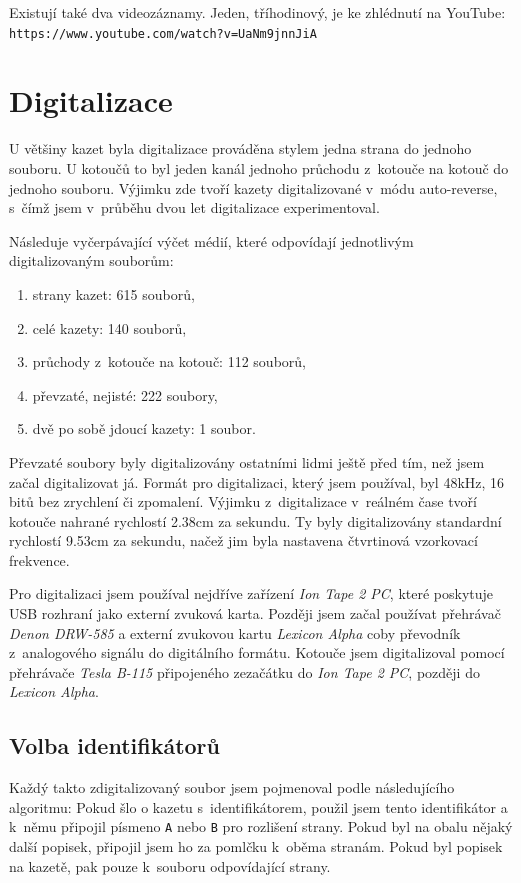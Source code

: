 Existují také dva videozáznamy. Jeden, tříhodinový, je ke zhlédnutí na YouTube:
\texttt{https://www.youtube.com/watch?v=UaNm9jnnJiA}

\section{Digitalizace}

U většiny kazet byla digitalizace prováděna stylem jedna strana do jednoho
souboru. U kotoučů to byl jeden kanál jednoho průchodu z~kotouče na kotouč do
jednoho souboru. Výjimku zde tvoří kazety digitalizované v~módu auto-reverse,
s~čímž jsem v~průběhu dvou let digitalizace experimentoval.

Následuje vyčerpávající výčet médií, které odpovídají jednotlivým
digitalizovaným souborům:

\begin{enumerate}
\item{strany kazet: 615 souborů,}
\item{celé kazety: 140 souborů,}
\item{průchody z~kotouče na kotouč: 112 souborů,}
\item{převzaté, nejisté: 222 soubory,}
\item{dvě po sobě jdoucí kazety: 1 soubor.}
\end{enumerate}

Převzaté soubory byly digitalizovány ostatními lidmi ještě před tím, než jsem
začal digitalizovat já. Formát pro digitalizaci, který jsem používal, byl 48kHz,
16 bitů bez zrychlení či zpomalení. Výjimku z~digitalizace v~reálném čase tvoří
kotouče nahrané rychlostí 2.38cm za sekundu. Ty byly digitalizovány standardní
rychlostí 9.53cm za sekundu, načež jim byla nastavena čtvrtinová vzorkovací
frekvence.

Pro digitalizaci jsem používal nejdříve zařízení {\em Ion Tape 2 PC}, které
poskytuje USB rozhraní jako externí zvuková karta. Později jsem začal používat
přehrávač {\em Denon DRW-585} a externí zvukovou kartu {\em Lexicon Alpha} coby převodník
z~analogového signálu do digitálního formátu. Kotouče jsem digitalizoval pomocí
přehrávače {\em Tesla B-115} připojeného zezačátku do {\em Ion Tape 2 PC},
později do {\em Lexicon Alpha}.

\subsection{Volba identifikátorů}

Každý takto zdigitalizovaný soubor jsem pojmenoval podle následujícího
algoritmu: Pokud šlo o kazetu s~identifikátorem, použil jsem tento identifikátor
a k~němu připojil písmeno \texttt{A} nebo \texttt{B} pro rozlišení strany. Pokud
byl na obalu nějaký další popisek, připojil jsem ho za pomlčku k~oběma stranám.
Pokud byl popisek na kazetě, pak pouze k~souboru odpovídající strany.

